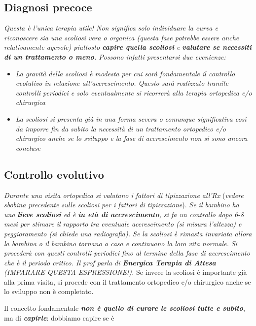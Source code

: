 \subsection{Diagnosi precoce}

\emph{Questa è l'unica terapia utile! Non significa solo individuare la curva e riconoscere sia una scoliosi vera o organica (questa fase potrebbe essere anche relativamente agevole) piuttosto \textbf{\emph{capire quella scoliosi}} e \textbf{\emph{valutare se necessiti di un trattamento o meno}}. Possono infatti presentarsi due evenienze:}

\begin{itemize}
\item
  \emph{La \emph{gravità} della scoliosi è \emph{modesta} per cui sarà fondamentale il \emph{controllo evolutivo} in relazione all'accrescimento. Questo sarà realizzato tramite controlli periodici e solo \emph{eventualmente} si ricorrerà alla terapia ortopedica e/o chirurgica}
\item
  \emph{La \emph{scoliosi} si presenta \emph{già in una forma severa}
  \emph{o} comunque \emph{significativa} così da imporre fin da subito la necessità di un trattamento ortopedico e/o chirurgico \emph{anche se lo sviluppo e la fase di accrescimento non si sono ancora concluse}}
\end{itemize}

\subsection{Controllo evolutivo}

\emph{Durante una visita ortopedica si valutano i fattori di tipizzazione all'Rx} (\emph{vedere sbobina precedente sulle scoliosi per i fattori di tipizzazione}). \emph{Se il bambino ha una \textbf{\emph{lieve scoliosi}} ed è \textbf{\emph{in età di accrescimento}}, si fa un controllo dopo 6-8 mesi per stimare il rapporto tra eventuale accrescimento (si misura l'altezza) e peggioramento (si chiede una radiografia). Se la scoliosi è rimasta invariata allora la bambina o il bambino tornano a casa e continuano la loro vita normale. \emph{Si procederà con questi controlli periodici fino al termine della fase di accrescimento che è il periodo critico}. Il prof parla di \textbf{Energica Terapia di Attesa} (IMPARARE QUESTA ESPRESSIONE!).} Se invece la scoliosi è importante già alla prima visita, si procede con il trattamento ortopedico e/o chirurgico anche se lo sviluppo non è completato.

Il concetto fondamentale \textbf{\emph{non è quello di curare le scoliosi tutte e subito}}, ma di \textbf{\emph{capirle}}: dobbiamo capire se è

